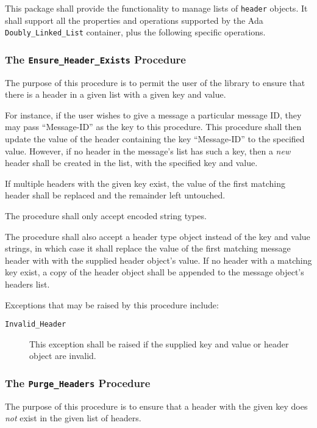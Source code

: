 \documentclass[11pt]{article}
\begin{document}
This package shall provide the functionality to manage lists of
\texttt{header} objects. It shall support all the properties and
operations supported by the Ada \texttt{Doubly\_Linked\_List}
container, plus the following specific operations.

\subsubsection{The \texttt{Ensure\_Header\_Exists} Procedure}

The purpose of this procedure is to permit the user of the library to
ensure that there is a header in a given list with a given key and
value. 

For instance, if the user wishes to give a message a particular
message ID, they may pass ``Message-ID'' as the key to this
procedure. This procedure shall then update the value of the header
containing the key ``Message-ID'' to the specified value. However, if
no header in the message's list has such a key, then a \emph{new}
header shall be created in the list, with the specified key and value.

If multiple headers with the given key exist, the value of the first
matching header shall be replaced and the remainder left untouched.

The procedure shall only accept encoded string types. 

The procedure shall also accept a header type object instead of the
key and value strings, in which case it shall replace the value of the
first matching message header with with the supplied header object's
value. If no header with a matching key exist, a copy of the header
object shall be appended to the message object's headers list.

Exceptions that may be raised by this procedure include:

\begin{description}

\item[\texttt{Invalid\_Header}] This exception shall be raised if the
  supplied key and value or header object are invalid.

\end{description}

\subsubsection{The \texttt{Purge\_Headers} Procedure}

The purpose of this procedure is to ensure that a header with the
given key does \emph{not} exist in the given list of headers.
\end{document}
